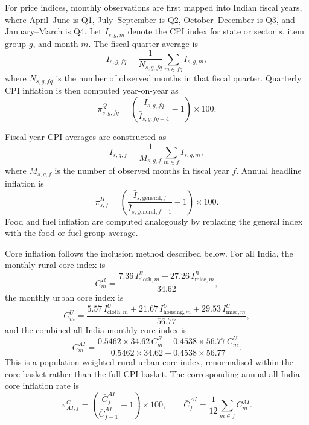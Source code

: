 \documentclass[11pt,a4paper]{article}
\begin{document}
For price indices, monthly observations are first mapped into Indian fiscal years, where April--June is Q1, July--September is Q2, October--December is Q3, and January--March is Q4. Let $I_{s,g,m}$ denote the CPI index for state or sector $s$, item group $g$, and month $m$. The fiscal-quarter average is
\begin{equation}
\bar I_{s,g,fq} = \frac{1}{N_{s,g,fq}}\sum_{m \in fq} I_{s,g,m},
\end{equation}
where $N_{s,g,fq}$ is the number of observed months in that fiscal quarter. Quarterly CPI inflation is then computed year-on-year as
\begin{equation}
\pi^{Q}_{s,g,fq} = \left(\frac{\bar I_{s,g,fq}}{\bar I_{s,g,fq-4}} - 1\right)\times 100.
\end{equation}

Fiscal-year CPI averages are constructed as
\begin{equation}
\bar I_{s,g,f} = \frac{1}{M_{s,g,f}}\sum_{m \in f} I_{s,g,m},
\end{equation}
where $M_{s,g,f}$ is the number of observed months in fiscal year $f$. Annual headline inflation is
\begin{equation}
\pi^{H}_{s,f} = \left(\frac{\bar I_{s,\mathrm{general},f}}{\bar I_{s,\mathrm{general},f-1}} - 1\right)\times 100.
\end{equation}
Food and fuel inflation are computed analogously by replacing the general index with the food or fuel group average.

Core inflation follows the inclusion method described below. For all India, the monthly rural core index is
\begin{equation}
C^{R}_{m} = \frac{7.36\,I^{R}_{\mathrm{cloth},m} + 27.26\,I^{R}_{\mathrm{misc},m}}{34.62},
\end{equation}
the monthly urban core index is
\begin{equation}
C^{U}_{m} = \frac{5.57\,I^{U}_{\mathrm{cloth},m} + 21.67\,I^{U}_{\mathrm{housing},m} + 29.53\,I^{U}_{\mathrm{misc},m}}{56.77},
\end{equation}
and the combined all-India monthly core index is
\begin{equation}
C^{AI}_{m} = \frac{0.5462\times 34.62\,C^{R}_{m} + 0.4538\times 56.77\,C^{U}_{m}}{0.5462\times 34.62 + 0.4538\times 56.77}.
\end{equation}
This is a population-weighted rural-urban core index, renormalised within the core basket rather than the full CPI basket. The corresponding annual all-India core inflation rate is
\begin{equation}
\pi^{C}_{AI,f} = \left(\frac{\bar C^{AI}_{f}}{\bar C^{AI}_{f-1}} - 1\right)\times 100,
\qquad
\bar C^{AI}_{f} = \frac{1}{12}\sum_{m \in f} C^{AI}_{m}.
\end{equation}
\end{document}
